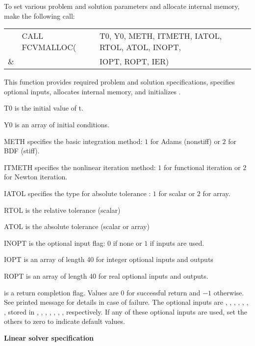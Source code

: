 \begin{Steps}
  To set various problem and solution parameters and allocate
  internal memory, make the following call:
  {
    \begin{tabular}[t]{@{}r@{}l@{}l@{}}
      &CALL FCVMALLOC(&T0, Y0, METH, ITMETH, IATOL, RTOL, ATOL, INOPT, \\
    \&&               &IOPT, ROPT, IER)
    \end{tabular}
  }
  {
    This function provides required problem and solution specifications, 
    specifies optional inputs,
    allocates internal memory, and initializes {\cvode}.
  }
  {
    \begin{args}[ITMETH ]
    \item[T0] is the initial value of t.
    \item[Y0] is an array of initial conditions.
    \item[METH] specifies the  basic integration method: 
      $1$ for Adams (nonstiff) or $2$ for BDF (stiff).
    \item[ITMETH] specifies the nonlinear iteration method: 
      $1$ for functional iteration or $2$ for Newton iteration.
    \item[IATOL] specifies the type for absolute tolerance :
      $1$ for scalar or $2$ for array.
    \item[RTOL] is the relative tolerance (scalar)
    \item[ATOL] is the absolute tolerance (scalar or array)
    \item[INOPT] is the optional input flag: $0$ if none or $1$ if inputs are used.
    \item[IOPT] is an array of length 40 for integer optional inputs and outputs
    \item[ROPT] is an array of length 40 for real optional inputs and outputs.
    \end{args}
  }
  {
     is a return completion flag.  Values are $0$ for successful return and 
    $-1$ otherwise. See printed message for details in case of failure.
  }
  {
    The optional inputs are , , , , , 
    , , stored in , , , 
    , , , , respectively.  
    If any of these optional inputs are used, set the others to zero to indicate 
    default values. 
  }

\item\label{i:fcvode_lin_solv_spec} {\bf Linear solver specification} 
  

\end{Steps}
